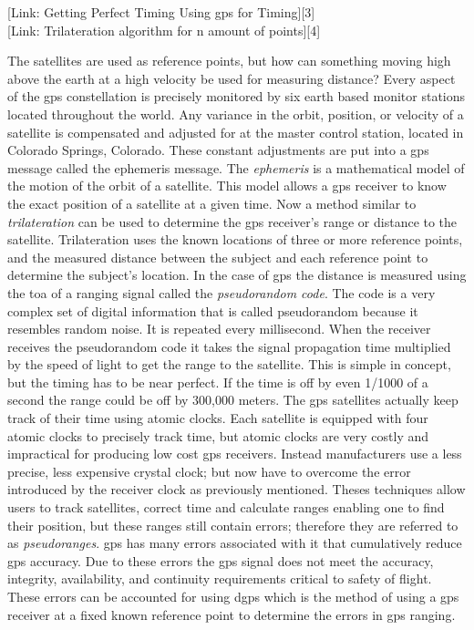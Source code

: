 {[}Link: Getting Perfect Timing Using \ac{gps} for Timing{]}{[}3{]}\\
{[}Link: Trilateration algorithm for n amount of points{]}{[}4{]}

The satellites are used as reference points, but how can something moving high above the earth at a high velocity be used for measuring distance?  Every aspect of the \ac{gps} constellation is precisely monitored by six earth based monitor stations located throughout the world.  Any variance in the orbit, position, or velocity of a satellite is compensated and adjusted for at the master control station, located in Colorado Springs, Colorado.  These constant adjustments are put into a \ac{gps} message called the ephemeris message. The \textit{ephemeris} is a mathematical model of the motion of the orbit of a satellite. This model allows a \ac{gps} receiver to know the exact position of a satellite at a given time.  Now a method similar to \textit{trilateration} can be used to determine the \ac{gps} receiver's range or distance to the satellite. Trilateration uses the known locations of three or more reference points, and the measured distance between the subject and each reference point to determine the subject's location. In the case of \ac{gps} the distance is measured using the \ac{toa} of a ranging signal called the \textit{pseudorandom code}. The code is a very complex set of digital information that is called pseudorandom because it resembles random noise. It is repeated every millisecond. When the receiver receives the pseudorandom code it takes the signal propagation time multiplied by the speed of light to get the range to the satellite.  This is simple in concept, but the timing has to be near perfect.  If the time is off by even 1/1000 of a second the range could be off by 300,000 meters.  The \ac{gps} satellites actually keep track of their time using atomic clocks.  Each satellite is equipped with four atomic clocks to precisely track time, but atomic clocks are very costly and impractical for producing low cost \ac{gps} receivers.  Instead manufacturers use a less precise, less expensive crystal clock; but now have to overcome the error introduced by the receiver clock as previously mentioned.  Theses techniques allow users to track satellites, correct time and calculate ranges enabling one to find their position, but these ranges still contain errors; therefore they are referred to as \textit{pseudoranges}. \ac{gps} has many errors associated with it that cumulatively reduce \ac{gps} accuracy. Due to these errors the \ac{gps} signal does not meet the accuracy, integrity, availability, and
continuity requirements critical to safety of flight.  These errors can be accounted for using \ac{dgps} which is the method of using a \ac{gps} receiver at a fixed known reference point to determine the errors in \ac{gps} ranging.

